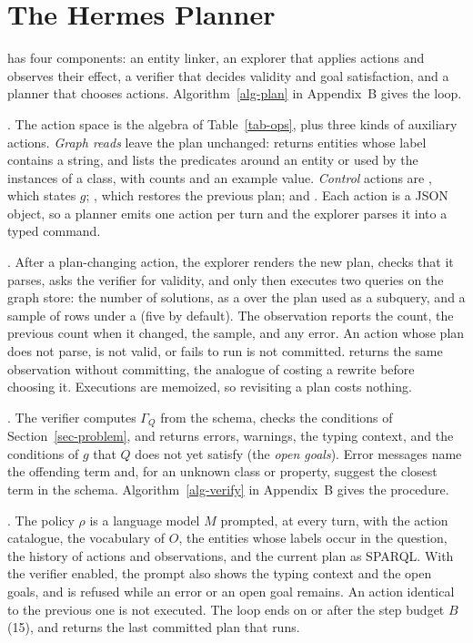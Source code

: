 \section{The Hermes Planner}
\label{sec-framework}

\hermes has four components: an entity linker, an explorer that applies
actions and observes their effect, a verifier that decides validity and
goal satisfaction, and a planner that chooses actions.
Algorithm~\ref{alg-plan} in Appendix~B gives the loop.

.
The action space is the algebra of Table~\ref{tab-ops}, plus three
kinds of auxiliary actions.
\emph{Graph reads} leave the plan unchanged:  returns
entities whose label contains a string, and  lists the
predicates around an entity or used by the instances of a class, with
counts and an example value.
\emph{Control} actions are , which states $g$;
, which restores the previous plan; and .
Each action is a JSON object, so a planner emits one action per turn
and the explorer parses it into a typed command.

.
After a plan-changing action, the explorer renders the new plan, checks
that it parses, asks the verifier for validity, and only then executes
two queries on the graph store: the number of solutions, as a
 over the plan used as a subquery, and a sample of rows under
a  (five by default).
The observation reports the count, the previous count when it changed,
the sample, and any error.
An action whose plan does not parse, is not valid, or fails to run is
not committed.
 returns the same observation without committing, the
analogue of costing a rewrite before choosing it.
Executions are memoized, so revisiting a plan costs nothing.

.
The verifier computes $\Gamma_Q$ from the schema, checks the
conditions of Section~\ref{sec-problem}, and returns errors, warnings,
the typing context, and the conditions of $g$ that $Q$ does not
yet satisfy (the \emph{open goals}).
Error messages name the offending term and, for an unknown class or
property, suggest the closest term in the schema.
Algorithm~\ref{alg-verify} in Appendix~B gives the procedure.

.
The policy $\rho$ is a language model $M$ prompted, at every turn, with
the action catalogue, the vocabulary of $O$, the entities whose labels occur in
the question, the history of actions and observations, and the current
plan as SPARQL.
With the verifier enabled, the prompt also shows the typing context and
the open goals, and  is refused while an error or an open
goal remains.
An action identical to the previous one is not executed.
The loop ends on  or after the step budget $B$ (15), and returns
the last committed plan that runs.


